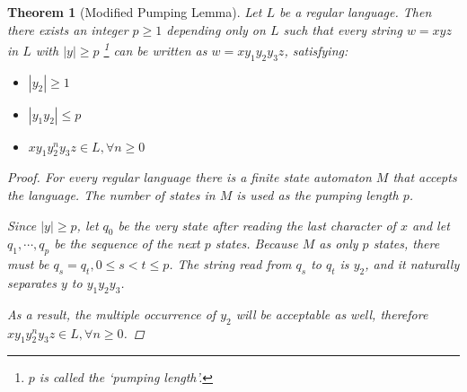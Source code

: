 \documentclass[a4paper]{article}
\newtheorem{theorem}{Theorem}
\newtheorem*{proof}{Proof}
\begin{document}
\begin{theorem}[Modified Pumping Lemma]\label{mpl}
Let $L$ be a regular language. Then there exists an integer $p\geqslant 1$
depending only on $L$ such that every string $w=xyz$ in $L$ with  $|y|\geqslant p$
\footnote{$p$ is called the `pumping length'.}
can be written as $w = xy_1y_2y_3z$, satisfying:
\begin{itemize}
\item $|y_2| \geqslant 1$
\item $|y_1y_2| \leqslant p$
\item $xy_1y_2^ny_3z\in L, \forall n \geqslant 0$
\end{itemize}
\begin{proof}
For every regular language there is a finite state automaton $M$ that accepts the language.
The number of states in $M$ is used as the pumping length $p$.\par
Since $|y|\geqslant p$, let $q_0$ be the very state after reading the last character of $x$ and let $q_1, \cdots, q_p$ be the sequence of the next $p$ states.
Because $M$ as only $p$ states, there must be $q_s=q_t,0\leqslant s<t\leqslant p$.
The string read from $q_s$ to $q_t$ is $y_2$, and it naturally separates $y$ to $y_1y_2y_3$.\par
As a result, the multiple occurrence of $y_2$ will be acceptable as well,
therefore $xy_1y_2^ny_3z\in L,\forall n\geqslant 0$.
\end{proof}
\end{theorem}
\end{document}
